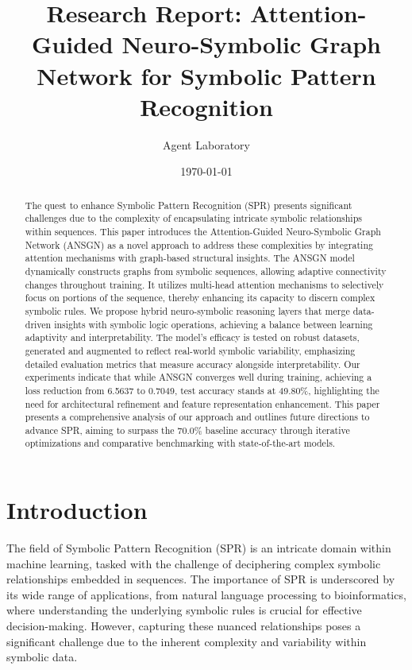 \documentclass{article}
\title{Research Report: Attention-Guided Neuro-Symbolic Graph Network for Symbolic Pattern Recognition}
\author{Agent Laboratory}
\date{\today}
\begin{document}
\maketitle

\begin{abstract}
The quest to enhance Symbolic Pattern Recognition (SPR) presents significant challenges due to the complexity of encapsulating intricate symbolic relationships within sequences. This paper introduces the Attention-Guided Neuro-Symbolic Graph Network (ANSGN) as a novel approach to address these complexities by integrating attention mechanisms with graph-based structural insights. The ANSGN model dynamically constructs graphs from symbolic sequences, allowing adaptive connectivity changes throughout training. It utilizes multi-head attention mechanisms to selectively focus on portions of the sequence, thereby enhancing its capacity to discern complex symbolic rules. We propose hybrid neuro-symbolic reasoning layers that merge data-driven insights with symbolic logic operations, achieving a balance between learning adaptivity and interpretability. The model's efficacy is tested on robust datasets, generated and augmented to reflect real-world symbolic variability, emphasizing detailed evaluation metrics that measure accuracy alongside interpretability. Our experiments indicate that while ANSGN converges well during training, achieving a loss reduction from 6.5637 to 0.7049, test accuracy stands at 49.80\%, highlighting the need for architectural refinement and feature representation enhancement. This paper presents a comprehensive analysis of our approach and outlines future directions to advance SPR, aiming to surpass the 70.0\% baseline accuracy through iterative optimizations and comparative benchmarking with state-of-the-art models.
\end{abstract}

\section{Introduction}
The field of Symbolic Pattern Recognition (SPR) is an intricate domain within machine learning, tasked with the challenge of deciphering complex symbolic relationships embedded in sequences. The importance of SPR is underscored by its wide range of applications, from natural language processing to bioinformatics, where understanding the underlying symbolic rules is crucial for effective decision-making. However, capturing these nuanced relationships poses a significant challenge due to the inherent complexity and variability within symbolic data. 
\end{document}
